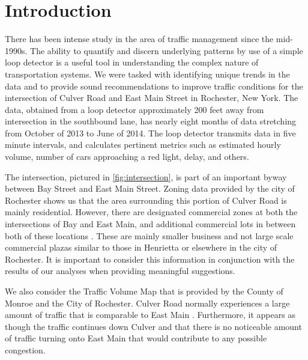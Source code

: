 \documentclass{report}
\begin{document}



\noindent
\section*{Introduction}


There has been intense study in the area of traffic management since the mid-1990s. The ability to quantify and discern underlying patterns by use of a simple loop detector is a useful tool in understanding the complex nature of transportation systems. We were tasked with identifying unique trends in the data and to provide sound recommendations to improve traffic conditions for the intersection of Culver Road and East Main Street in Rochester, New York. The data, obtained from a loop detector approximately 200 feet away from intersection in the southbound lane, has nearly eight months of data stretching from October of 2013 to June of 2014. The loop detector transmits data in five minute intervals, and calculates pertinent metrics such as estimated hourly volume, number of cars approaching a red light, delay, and others.

The intersection, pictured in \ref{fig:intersection}, is part of an important byway between Bay Street and East Main Street. Zoning data provided by the city of Rochester shows us that the area surrounding this portion of Culver Road is mainly residential. However, there are designated commercial zones at both the intersections of Bay and East Main, and additional commercial lots in between both of these locations \cite{PropInfo}. These are mainly smaller business and not large scale commercial plazas similar to those in Henrietta or elsewhere in the city of Rochester. It is important to consider this information in conjunction with the results of our analyses when providing meaningful suggestions.

We also consider the Traffic Volume Map that is provided by the County of Monroe and the City of Rochester. Culver Road normally experiences a large amount of traffic that is comparable to East Main \cite{TrafficMap}. Furthermore, it appears as though the traffic continues down Culver and that there is no noticeable amount of traffic turning onto East Main that would contribute to any possible congestion.
\end{document}

